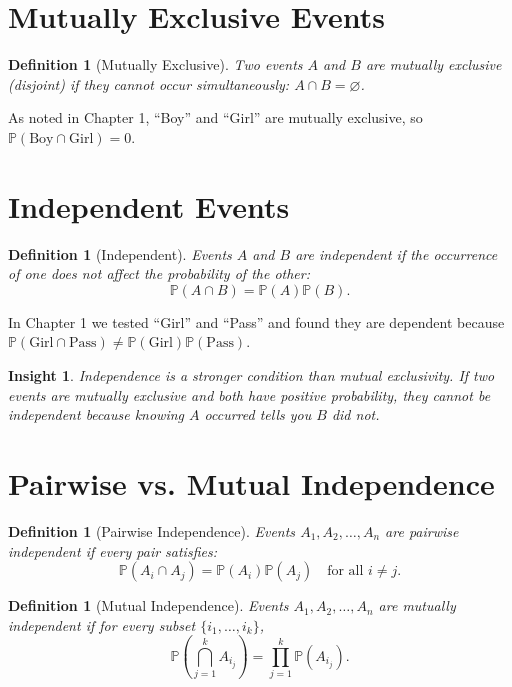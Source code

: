 \documentclass[12pt,a4paper,oneside]{report}
\theoremstyle{mytheorem}
\theoremstyle{mydefinition}
\newtheorem{definition}[theorem]{Definition}
\theoremstyle{myremark}
\newtheorem{insight}[theorem]{Insight}
\newcommand{\Prob}{\mathbb{P}}
\begin{document}
\section{Mutually Exclusive Events}
\begin{definition}[Mutually Exclusive]
Two events $A$ and $B$ are mutually exclusive (disjoint) if they cannot occur simultaneously: $A \cap B = \varnothing$.
\end{definition}

As noted in Chapter 1, “Boy” and “Girl” are mutually exclusive, so $\Prob(\text{Boy} \cap \text{Girl}) = 0$.

\section{Independent Events}
\begin{definition}[Independent]
Events $A$ and $B$ are independent if the occurrence of one does not affect the probability of the other:
\[
\Prob(A \cap B) = \Prob(A) \Prob(B).
\]
\end{definition}

In Chapter 1 we tested “Girl” and “Pass” and found they are dependent because $\Prob(\text{Girl} \cap \text{Pass}) \neq \Prob(\text{Girl})\Prob(\text{Pass})$.

\begin{insight}
Independence is a stronger condition than mutual exclusivity. If two events are mutually exclusive and both have positive probability, they cannot be independent because knowing $A$ occurred tells you $B$ did not.
\end{insight}

\section{Pairwise vs. Mutual Independence}
\begin{definition}[Pairwise Independence]
Events $A_1, A_2, \ldots, A_n$ are pairwise independent if every pair satisfies:
\[
\Prob(A_i \cap A_j) = \Prob(A_i) \Prob(A_j) \quad \text{for all } i \neq j.
\]
\end{definition}

\begin{definition}[Mutual Independence]
Events $A_1, A_2, \ldots, A_n$ are mutually independent if for every subset $\{i_1, \ldots, i_k\}$,
\[
\Prob\left(\bigcap_{j=1}^k A_{i_j}\right) = \prod_{j=1}^k \Prob(A_{i_j}).
\]
\end{definition}
\end{document}
